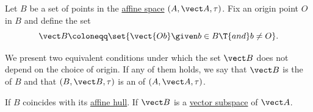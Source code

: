 \begin{definition}\label{def:affine_subspace}
  Let \( B \) be a set of points in the \hyperref[def:affine_space]{affine space} \( (A, \vect A, \tau) \). Fix an origin point \( O \) in \( B \) and define the set
  \begin{equation}\label{eq:def:affine_subspace/direction}
    \vect B \coloneqq \set{ \vect{Ob} \given b \in B \T{and} b \neq O }.
  \end{equation}

  We present two equivalent conditions under which the set \( \vect B \) does not depend on the choice of origin. If any of them holds, we say that \( \vect B \) is the  of \( B \) and that \( (B, \vect B, \tau) \) is an  of \( (A, \vect A, \tau) \).

  \begin{thmenum}
     If \( B \) coincides with its \hyperref[def:affine_hull]{affine hull}.
     If \( \vect B \) is a \hyperref[def:module/subobject]{vector subspace} of \( \vect A \).
  \end{thmenum}
\end{definition}
